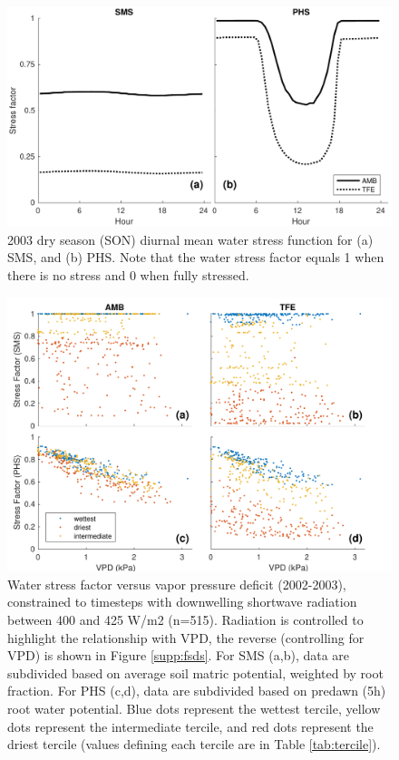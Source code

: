 \documentclass[draft,linenumbers]{agujournal}
\begin{document}
  
    \clearpage
    \begin{figure}[h]
     \centering
     \includegraphics[width=30pc]{../figs3/fig4.pdf}
     \caption{2003 dry season (SON) diurnal mean water stress function for 
     (a) SMS, and
     (b) PHS.
     Note that the water stress factor equals 1 when there is no stress and 0 when fully stressed.
     }
     \label{fig:stress1}
  \end{figure}
  
      \clearpage
    \begin{figure}[h]
     \centering
     \includegraphics[width=30pc]{../figs3/vpdstress.pdf}
     \caption{Water stress factor versus vapor pressure deficit (2002-2003), constrained to timesteps with downwelling shortwave radiation between 400 and 425 W/m2 (n=515).
     Radiation is controlled to highlight the relationship with VPD, the reverse (controlling for VPD) is shown in Figure \ref{supp:fsds}.
     For SMS (a,b), data are subdivided based on average soil matric potential, weighted by root fraction.
     For PHS (c,d), data are subdivided based on predawn (5h) root water potential.
     Blue dots represent the wettest tercile, yellow dots represent the intermediate tercile, and red dots represent the driest tercile (values defining each tercile are in Table \ref{tab:tercile}).
     }
     \label{fig:stress2}
       \end{figure}
      
\end{document}
